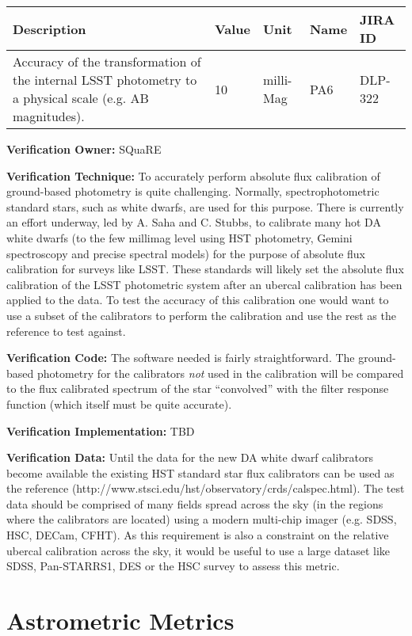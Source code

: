\documentclass[DM,lsstdraft,toc]{lsstdoc}
\begin{document}
\begin{longtable}[]{@{}p{}llll@{}}
\toprule
Description & Value & Unit & Name & JIRA ID\tabularnewline
\midrule
\endhead
Accuracy of the transformation of the internal LSST photometry to a
physical scale (e.g. AB magnitudes). & 10 & milli-Mag & PA6 &
DLP-322\tabularnewline
\bottomrule
\end{longtable}

\textbf{Verification Owner:} SQuaRE

\textbf{Verification Technique:} To accurately perform absolute flux
calibration of ground-based photometry is quite challenging. Normally,
spectrophotometric standard stars, such as white dwarfs, are used for
this purpose. There is currently an effort underway, led by A. Saha and
C. Stubbs, to calibrate many hot DA white dwarfs (to the few millimag
level using HST photometry, Gemini spectroscopy and precise spectral
models) for the purpose of absolute flux calibration for surveys like
LSST. These standards will likely set the absolute flux calibration of
the LSST photometric system after an ubercal calibration has been
applied to the data. To test the accuracy of this calibration one would
want to use a subset of the calibrators to perform the calibration and
use the rest as the reference to test against.

\textbf{Verification Code:} The software needed is fairly
straightforward. The ground-based photometry for the calibrators
\emph{not} used in the calibration will be compared to the flux
calibrated spectrum of the star ``convolved'' with the filter response
function (which itself must be quite accurate).

\textbf{Verification Implementation:} TBD

\textbf{Verification Data:} Until the data for the new DA white dwarf
calibrators become available the existing HST standard star flux
calibrators can be used as the reference
(http://www.stsci.edu/hst/observatory/crds/calspec.html).\protect\hypertarget{_Toc301352570}{}{}
The test data should be comprised of many fields spread across the sky
(in the regions where the calibrators are located) using a modern
multi-chip imager (e.g. SDSS, HSC, DECam, CFHT). As this requirement is
also a constraint on the relative ubercal calibration across the sky, it
would be useful to use a large dataset like SDSS, Pan-STARRS1, DES or
the HSC survey to assess this metric.

\section{Astrometric Metrics}\label{astrometric-metrics}
\end{document}
